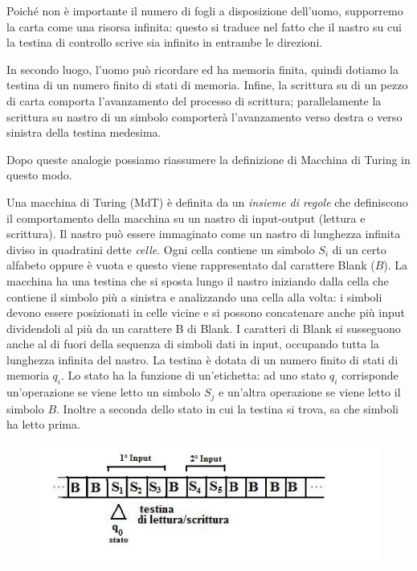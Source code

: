 Poich\'e non \`e importante il numero di fogli a disposizione dell'uomo,
supporremo la carta come una risorsa infinita: questo si traduce nel fatto che
il nastro su cui la testina di controllo scrive sia infinito in entrambe le
direzioni.

In secondo luogo, l'uomo pu\`o ricordare ed ha memoria finita, quindi dotiamo la
testina di un numero finito di stati di memoria. Infine, la scrittura su di un
pezzo di carta comporta l'avanzamento del processo di scrittura; parallelamente
la scrittura su nastro di un simbolo comporter\`a l'avanzamento verso destra o
verso sinistra della testina medesima.

Dopo queste analogie possiamo riassumere la definizione di Macchina di Turing in
questo modo.

Una macchina di Turing (MdT) \`e definita da un \textsl{insieme di
  regole} che definiscono il comportamento della macchina su un nastro
di input-output (lettura e scrittura). Il nastro pu\`o essere
immaginato come un nastro di lunghezza infinita diviso in quadratini
dette \textsl{celle}. Ogni cella contiene un simbolo $S_i$ di un certo
alfabeto oppure \`e vuota e questo viene rappresentato dal carattere
Blank ($B$). La macchina ha una testina che si sposta lungo il nastro
iniziando dalla cella che contiene il simbolo pi\`u a sinistra e
analizzando una cella alla volta: i simboli devono essere posizionati
in celle vicine e si possono concatenare anche pi\`u input dividendoli
al pi\`u da un carattere B di Blank. I caratteri di Blank si
susseguono anche al di fuori della sequenza di simboli dati in input,
occupando tutta la lunghezza infinita del nastro.  La testina \`e
dotata di un numero finito di stati di memoria $q_i$. Lo stato ha la
funzione di un'etichetta: ad uno stato $q_i$ corrisponde un'operazione
se viene letto un simbolo $S_j$ e un'altra operazione se viene letto
il simbolo $B$. Inoltre a seconda dello stato in cui la testina si
trova, sa che simboli ha letto prima.

\begin{figure}[htbp!]
\centering
\includegraphics[scale=0.8]{img/Nastro.jpg}
\end{figure}

